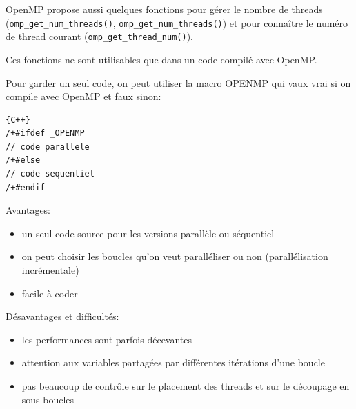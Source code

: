 \documentclass{beamer}
\begin{document}
\begin{frame}[fragile]

OpenMP propose aussi quelques fonctions pour gérer le nombre de threads (\verb|omp_get_num_threads()|, \verb|omp_get_num_threads()|) et pour connaître le numéro de thread courant (\verb|omp_get_thread_num()|).

\vfill Ces fonctions ne sont utilisables que dans un code compilé avec OpenMP.

Pour garder un seul code, on peut utiliser la macro {\textunderscore}OPENMP qui vaux vrai si on compile avec OpenMP et faux sinon:
\begin{center}
\begin{lstlisting}{C++}
/+#ifdef _OPENMP
// code parallele
/+#else
// code sequentiel
/+#endif
\end{lstlisting}
\end{center}

\end{frame}

\begin{frame}

Avantages:
\begin{itemize}
	\item un seul code source pour les versions parallèle ou séquentiel
	\item on peut choisir les boucles qu'on veut paralléliser ou non (parallélisation incrémentale)
	\item facile à coder
\end{itemize}
\vfill

Désavantages et difficultés:
\begin{itemize}
	\item les performances sont parfois décevantes
	\item attention aux variables partagées par différentes itérations d'une boucle
	\item pas beaucoup de contrôle sur le placement des threads et sur le découpage en sous-boucles
\end{itemize}

\end{frame}
\end{document}
